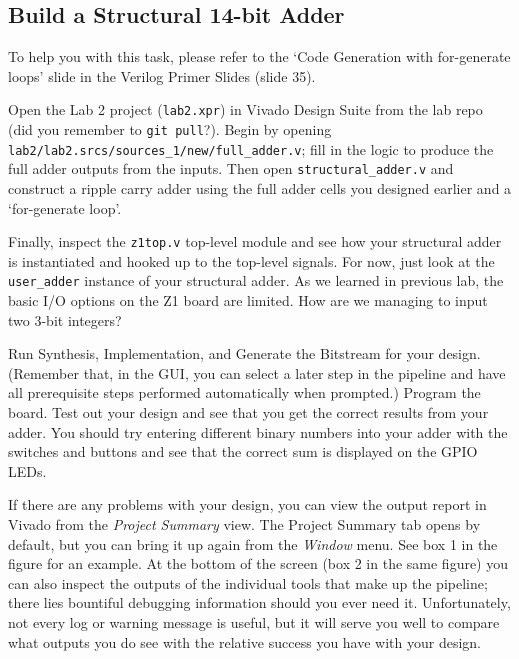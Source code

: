 \documentclass[11pt]{article}
\begin{document}
\subsection{Build a Structural 14-bit Adder}
To help you with this task, please refer to the `Code Generation with for-generate loops' slide in the Verilog Primer Slides (slide 35).

Open the Lab 2 project (\verb|lab2.xpr|) in Vivado Design Suite from the lab repo (did you remember to \verb|git pull|?). Begin by opening \verb|lab2/lab2.srcs/sources_1/new/full_adder.v|; fill in the logic to produce the full adder outputs from the inputs. Then open \verb|structural_adder.v| and construct a ripple carry adder using the full adder cells you designed earlier and a `for-generate loop'.

Finally, inspect the \verb|z1top.v| top-level module and see how your structural adder is instantiated and hooked up to the top-level signals. For now, just look at the \verb|user_adder| instance of your structural adder. As we learned in previous lab, the basic I/O options on the Z1 board are limited. How are we managing to input two 3-bit integers?

Run Synthesis, Implementation, and Generate the Bitstream for your design. (Remember that, in the GUI, you can select a later step in the pipeline and have all prerequisite steps performed automatically when prompted.) Program the board. Test out your design and see that you get the correct results from your adder. You should try entering different binary numbers into your adder with the switches and buttons and see that the correct sum is displayed on the GPIO LEDs.

If there are any problems with your design, you can view the output report in Vivado from the \emph{Project Summary} view. The Project Summary tab opens by default, but you can bring it up again from the \emph{Window} menu. See box 1 in the figure for an example. At the bottom of the screen (box 2 in the same figure) you can also inspect the outputs of the individual tools that make up the pipeline; there lies bountiful debugging information should you ever need it. Unfortunately, not every log or warning message is useful, but it will serve you well to compare what outputs you do see with the relative success you have with your design.
\end{document}
